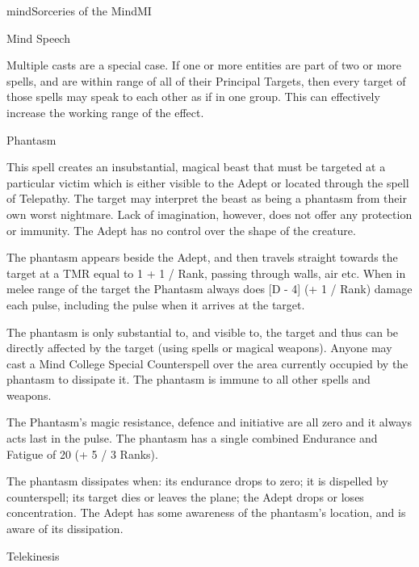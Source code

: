 \begin{college}[1.6]{mind}{Sorceries of the Mind}{MI}
\begin{spell}[S-5]{Mind Speech}
\begin{effects}
Multiple casts are a special case. If one or more entities are part of
two or more spells, and are within range of all of their Principal
Targets, then every target of those spells may speak to each other as
if in one group. This can effectively increase the working range of
the effect.
\end{effects}
\end{spell}

\begin{spell}[S-6]{Phantasm}

\begin{effects}
This spell creates an insubstantial, magical beast that must be
targeted at a particular victim which is either visible to the Adept
or located through the spell of Telepathy. The target may interpret
the beast as being a phantasm from their own worst nightmare. Lack of
imagination, however, does not offer any protection or immunity. The
Adept has no control over the shape of the creature.

The phantasm appears beside the Adept, and then travels straight
towards the target at a TMR equal to 1 + 1 / Rank, passing through
walls, air etc. When in melee range of the target the Phantasm always
does [D - 4] (+ 1 / Rank) damage each pulse, including the pulse when
it arrives at the target.

The phantasm is only substantial to, and visible to, the target and
thus can be directly affected by the target (using spells or magical
weapons). Anyone may cast a Mind College Special Counterspell over
the area currently occupied by the phantasm to dissipate it. The
phantasm is immune to all other spells and weapons.

The Phantasm's magic resistance, defence and initiative are all zero
and it always acts last in the pulse. The phantasm has a single
combined Endurance and Fatigue of 20 (+ 5 / 3 Ranks).

The phantasm dissipates when: its endurance drops to zero; it is
dispelled by counterspell; its target dies or leaves the plane; the
Adept drops or loses concentration. The Adept has some awareness of
the phantasm's location, and is aware of its dissipation.
\end{effects}
\end{spell}

\begin{spell}[S-7]{Telekinesis}


\end{spell}
\end{college}
